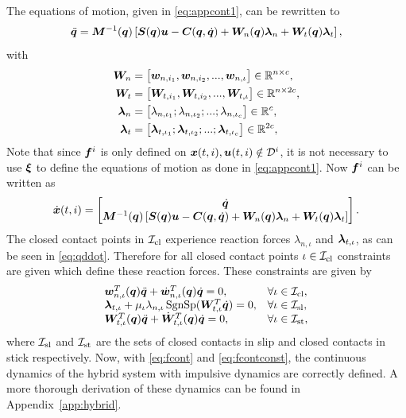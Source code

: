 \documentclass[../DC2017114Bouma.tex]{subfiles}
\begin{document}
The equations of motion, given in \eqref{eq:appcont1}, can be rewritten to
\begin{align}
\ddot{{\boldsymbol{q}}} = {\boldsymbol{M}}^{-1}({\boldsymbol{q}})\left[ {\boldsymbol{S}}({\boldsymbol{q}}){\boldsymbol{u}} - {\boldsymbol{C}}({\boldsymbol{q}},\dot{{\boldsymbol{q}}}) + {\boldsymbol{W}}_{n}({\boldsymbol{q}})\boldsymbol{\lambda}_{n} + {\boldsymbol{W}}_{t}({\boldsymbol{q}})\boldsymbol{\lambda}_{t}\right],\label{eq:qddot}
\end{align}
with
\begin{align}
{\boldsymbol{W}}_n &= \begin{bmatrix}
{\boldsymbol{w}}_{n,i_1},{\boldsymbol{w}}_{n,i_2},...,{\boldsymbol{w}}_{n,\iota}
\end{bmatrix}\in\mathbb{R}^{n\times c},\\
{\boldsymbol{W}}_t &= \begin{bmatrix}
{\boldsymbol{W}}_{t,i_1},{\boldsymbol{W}}_{t,i_2},...,{\boldsymbol{W}}_{t,\iota} 
\end{bmatrix}\in\mathbb{R}^{n\times 2c},\\
\boldsymbol{\lambda}_n &= \begin{bmatrix}
\lambda_{n,\iota_1};\lambda_{n,\iota_2};...;\lambda_{n,\iota_c} 
\end{bmatrix}\in\mathbb{R}^{c},\\
\boldsymbol{\lambda}_t &= \begin{bmatrix}
\boldsymbol{\lambda}_{t,\iota_1};\boldsymbol{\lambda}_{t,\iota_2};...;\boldsymbol{\lambda}_{t,\iota_c} 
\end{bmatrix}\in\mathbb{R}^{2c},
\end{align}
Note that since ${\boldsymbol{f}}^i$ is only defined on ${\boldsymbol{x}}(t,i),{\boldsymbol{u}}(t,i)\notin \mathcal{D}^i$, it is not necessary to use $\boldsymbol{\xi}$ to define the equations of motion as done in \eqref{eq:appcont1}. Now ${\boldsymbol{f}}^i$ can be written as
\begin{align}
\dot{{\boldsymbol{x}}}(t,i) =\begin{bmatrix}
\dot{{\boldsymbol{q}}}\\ {\boldsymbol{M}}^{-1}({\boldsymbol{q}})\left[ {\boldsymbol{S}}({\boldsymbol{q}}){\boldsymbol{u}} - {\boldsymbol{C}}({\boldsymbol{q}},\dot{{\boldsymbol{q}}}) + {\boldsymbol{W}}_{n}({\boldsymbol{q}})\boldsymbol{\lambda}_{n} + {\boldsymbol{W}}_{t}({\boldsymbol{q}})\boldsymbol{\lambda}_{t}\right]
\end{bmatrix}.\label{eq:fcont}
\end{align}
The closed contact points in $\mathcal{I}_{\text{cl}}$ experience reaction forces $\lambda_{n,\iota}$ and $\boldsymbol{\lambda}_{t,\iota}$, as can be seen in \eqref{eq:qddot}. Therefore for all closed contact points $\iota\in\mathcal{I}_{\text{cl}}$ constraints are given which define these reaction forces. These constraints are given by
\begin{equation}
\begin{array}{ll}
{\boldsymbol{w}}^T_{n,\iota}({\boldsymbol{q}})\ddot{{\boldsymbol{q}}} + \dot{{\boldsymbol{w}}}^T_{n,\iota}({\boldsymbol{q}})\dot{{\boldsymbol{q}}} = 0, & \forall \iota\in\mathcal{I}_{\text{cl}},\\
\boldsymbol{\lambda}_{t,\iota} + \mu_{\iota}\lambda_{n,\iota}\operatorname{\text{SgnSp}}({\boldsymbol{W}}_{t,\iota}^T\dot{{\boldsymbol{q}}}) = 0, & \forall \iota\in\mathcal{I}_{\text{sl}},\\
{\boldsymbol{W}}^T_{t,\iota}({\boldsymbol{q}})\ddot{{\boldsymbol{q}}} + \dot{{\boldsymbol{W}}}^T_{t,\iota}({\boldsymbol{q}})\dot{{\boldsymbol{q}}} = 0, & \forall \iota\in\mathcal{I}_{\text{st}},
\end{array}\label{eq:fcontconst}
\end{equation}
where $\mathcal{I}_{\text{sl}}$ and $\mathcal{I}_{\text{st}}$ are the sets of closed contacts in slip and closed contacts in stick respectively. Now, with \eqref{eq:fcont} and \eqref{eq:fcontconst}, the continuous dynamics of the hybrid system with impulsive dynamics are correctly defined. A more thorough derivation of these dynamics can be found in Appendix~\ref{app:hybrid}.
\end{document}
